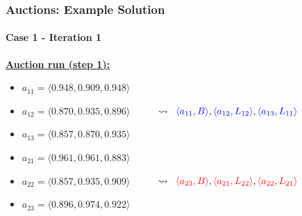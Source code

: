 \begin{frame}
	\frametitle{Auctions: Example Solution}
	\framesubtitle{Case 1 - Iteration 1}
	
	\vspace{0.3cm}
	
	\textbf{\underline{Auction run (step 1):}}
	
	\begin{itemize}
		\item<1-> $ a_{11} = \langle 0.948,0.909,0.948 \rangle $
		\item<1-> $ a_{12} = \langle 0.870,0.935,0.896 \rangle $ $ \;\;\;\;\;\;\;\;\; \leadsto
					\;\; \textcolor{blue}{\langle a_{11},B \rangle}, \textcolor{blue}{\langle
					a_{12},L_{12} \rangle}, \textcolor{blue}{\langle a_{13},L_{11} \rangle} $
		\item<1-> $ a_{13} = \langle 0.857,0.870,0.935 \rangle $
		\vspace{0.5cm}
		\item<2-> $ a_{21} = \langle 0.961,0.961,0.883 \rangle $
		\item<2-> $ a_{22} = \langle 0.857,0.935,0.909 \rangle $ $ \;\;\;\;\;\;\;\;\; \leadsto
					\;\; \textcolor{red}{\langle a_{23},B \rangle}, \textcolor{red}{\langle
					a_{21},L_{22} \rangle}, \textcolor{red}{\langle a_{22},L_{21} \rangle} $
		\item<2-> $ a_{23} = \langle 0.896,0.974,0.922 \rangle $
	\end{itemize}
\end{frame}

